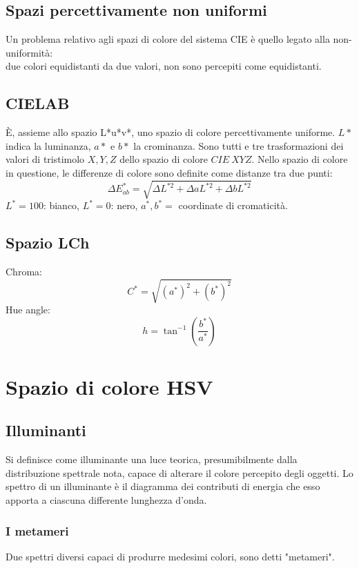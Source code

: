 \documentclass{report}
\begin{document}
	\subsection{Spazi percettivamente non uniformi}
	Un problema relativo agli spazi di colore del sistema CIE è quello legato alla non-uniformità:\\
	due colori equidistanti da due valori, non sono percepiti come equidistanti.
	\subsection{CIELAB}
	È, assieme allo spazio L*u*v*, uno spazio di colore percettivamente uniforme.
	$L*$ indica la luminanza, $a*$ e $b*$ la crominanza.
	Sono tutti e tre trasformazioni dei valori di tristimolo $X,Y,Z$ dello spazio di colore $CIE \ XYZ$.
	Nello spazio di colore in questione, le differenze di colore sono definite come distanze tra due punti:
	$$
	\Delta E^*_{ab} = \sqrt{\Delta L^{*2} + \Delta a L^{*2} + \Delta b L^{*2}}
	$$
	$L^* = 100$: bianco, $L^*=0$: nero, $a^*,b^* =$ coordinate di cromaticità.
		
	\subsection{Spazio LCh}
	Chroma:
	$$C^* = \sqrt{(a^*)^2 + (b^*)^2}$$
	Hue angle:
	$$h = \tan^{-1}(\frac{b^*}{a^*})$$
	\newpage
	\section{Spazio di colore HSV}
	\subsection{Illuminanti}
	Si definisce come illuminante una luce teorica, presumibilmente dalla\\distribuzione spettrale nota, capace di alterare il colore percepito degli oggetti. Lo spettro di un illuminante è il diagramma dei contributi di energia che esso apporta a ciascuna differente lunghezza d'onda.
	\subsubsection{I metameri}
	Due spettri diversi capaci di produrre medesimi colori, sono detti "metameri".
\end{document}
